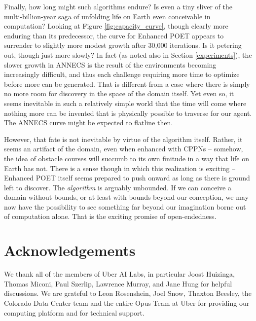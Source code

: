 \documentclass{article}
\newcommand{\ks}[1]{\comments{\textcolor{purple}{[Ken: #1]}}}
\newcommand{\jl}[1]{\comments{\textcolor{cyan}{[Joel: #1]}}}
\newcommand{\rwang}[1]{\comments{\textcolor{blue}{[Rui: #1]}}}
\newcommand{\comments}[1]{#1} %
\begin{document}
Finally, how long might such algorithms endure? Is even a tiny sliver of the multi-billion-year saga of unfolding life on Earth even conceivable in computation? Looking at Figure \ref{fig:capacity_curve}, though clearly more enduring than its predecessor,
the curve for Enhanced POET appears to surrender to slightly more modest growth after 30,000 iterations. Is it petering out, though just more slowly?  In fact (as noted also in Section \ref{experiments}), the slower growth in ANNECS is the result of the environments becoming increasingly difficult, and thus each challenge requiring more time to optimize before more can be generated. That is different from a case where there is simply no more room for discovery in the space of the domain itself.  Yet even so, it seems inevitable in such a relatively simple world that the time will come where nothing more can be invented that is physically possible to traverse for our agent.  The ANNECS curve might be expected to flatline then.

However, that fate is not inevitable by virtue of the algorithm itself.  Rather, it seems an artifact of the domain, even when enhanced with CPPNs -- somehow, the idea of obstacle courses will succumb to its own finitude in a way that life on Earth has not.  There is a sense though in which this realization is exciting -- Enhanced POET itself seems prepared to push onward as long as there is ground left to discover.  The \emph{algorithm} is arguably unbounded.  If we can conceive a domain without bounds, or at least with bounds beyond our conception, we may now have the possibility to see something far beyond our imagination borne out of computation alone.  That is the exciting promise of open-endedness.



\section*{Acknowledgements}
We thank all of the members of Uber AI Labs, in particular Joost Huizinga, Thomas Miconi, Paul Szerlip, Lawrence Murray, and Jane Hung for helpful discussions. We are grateful to Leon Rosenshein, Joel Snow, Thaxton Beesley, the Colorado Data Center team and the entire Opus Team at Uber for providing our computing platform and for technical support.
\end{document}
